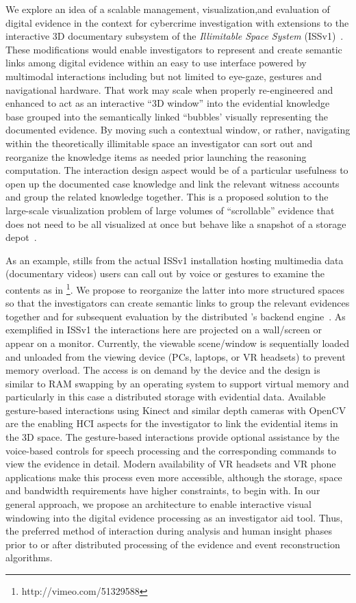 We explore an idea of a scalable management, visualization,and evaluation of digital evidence in the context 
for cybercrime investigation with extensions to the interactive 3D documentary subsystem of the 
\emph{Illimitable Space System} (ISSv1)~\cite{msong-phdthesis-2012}.
These modifications would enable investigators to represent and create semantic links among digital evidence within an easy to 
use interface powered by multimodal interactions including but not limited to eye-gaze, gestures and navigational hardware.
That work may scale when properly re-engineered and enhanced to act as an interactive ``3D window” into the 
evidential knowledge base grouped into the semantically linked ``bubbles' visually representing the 
documented evidence. By moving such a contextual window, or rather, navigating within the 
theoretically illimitable space an investigator can sort out and reorganize the knowledge items as 
needed prior launching the reasoning computation. The interaction design aspect would be of a 
particular usefulness to open up the documented case knowledge and link the relevant witness accounts 
and group the related knowledge together. This is a proposed solution to the large-scale visualization 
problem of large volumes of ``scrollable'' evidence that does not need to be all visualized at once 
but behave like a snapshot of a storage depot~\cite{mokhov-phd-thesis-2013}.

As an example,
stills from the actual ISSv1 installation hosting multimedia data (documentary videos) users can 
call out by voice or gestures to examine the contents as in \footnote{http://vimeo.com/51329588}. 
We propose to reorganize the latter into more structured spaces so that the investigators can create semantic 
links to group the relevant evidences together and for subsequent evaluation by the distributed
{\gipsy}'s backend engine~\cite{mokhov-phd-thesis-2013}. As exemplified in ISSv1 the interactions
here are projected on a wall/screen or appear on a monitor.
%
Currently, the viewable scene/window is sequentially loaded and unloaded from the viewing 
device (PCs, laptops, or VR headsets) to prevent memory overload. The access is on demand 
by the device and the design is similar to RAM swapping by an operating system to support 
virtual memory and particularly in this case a distributed storage with evidential data. 
Available gesture-based interactions using Kinect and similar depth cameras with OpenCV 
are the enabling HCI aspects for the investigator to link the evidential items in the 3D space.
The gesture-based interactions provide optional assistance by 
the voice-based controls for speech processing and the corresponding
commands to view the evidence in detail. Modern availability of 
VR headsets and VR phone applications make this process even more accessible, 
although the storage, space and bandwidth requirements have higher constraints, 
to begin with.
%
In our general approach, we propose an architecture to enable interactive 
visual windowing into the digital evidence processing as an investigator aid tool. Thus, 
the preferred method of interaction during analysis and human insight phases prior to or after 
distributed processing of the evidence and event reconstruction algorithms.

